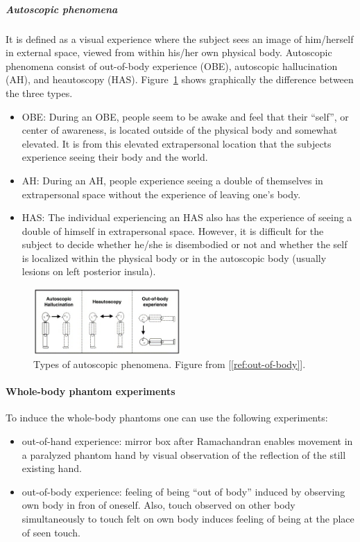 \documentclass[12pt,article,oneside,a4paper]{memoir}
\begin{document}
\subparagraph{Autoscopic phenomena}
It is defined as a visual experience where the subject sees an image of 
him/herself in external space, viewed from within his/her own physical body.
Autoscopic phenomena consist of out-of-body experience (OBE), autoscopic
hallucination (AH), and heautoscopy (HAS). Figure~\ref{fig:autoscopic-phenomena}
shows graphically the difference between the three types.
\begin{itemize}
\item OBE: During an OBE, people seem to be awake and feel that their ``self'',
or center of awareness, is located outside of the physical body and somewhat
elevated. It is from this elevated extrapersonal location that the subjects
experience seeing their body and the world.
\item AH: During an AH, people experience seeing a double of themselves in 
extrapersonal space without the experience of leaving one's body.
\item HAS: The individual experiencing an HAS also has the experience of seeing
a double of himself in extrapersonal space. However, it is difficult for the
subject to decide whether he/she is disembodied or not and whether the self is
localized within the physical body or in the autoscopic body (usually lesions on
left posterior insula).
\end{itemize}

\begin{figure}[h]
  \centering
  \includegraphics[width=0.5\textwidth]{imgs/autoscopic-phenomena.png}
  \caption{Types of autoscopic phenomena. Figure from [\ref{ref:out-of-body}]. }
  \label{fig:autoscopic-phenomena}
\end{figure}

\paragraph{Whole-body phantom experiments}
To induce the whole-body phantoms one can use the following experiments:
\begin{itemize}
\item out-of-hand experience: mirror box after Ramachandran enables movement in a
paralyzed phantom hand by visual observation of the reflection of the still
existing hand.
\item out-of-body experience: feeling of being ``out of body'' induced by
observing own body in fron of oneself. Also, touch observed on other body
simultaneously to touch felt on own body induces feeling of being at the place
of seen touch.
\end{itemize}
\end{document}
